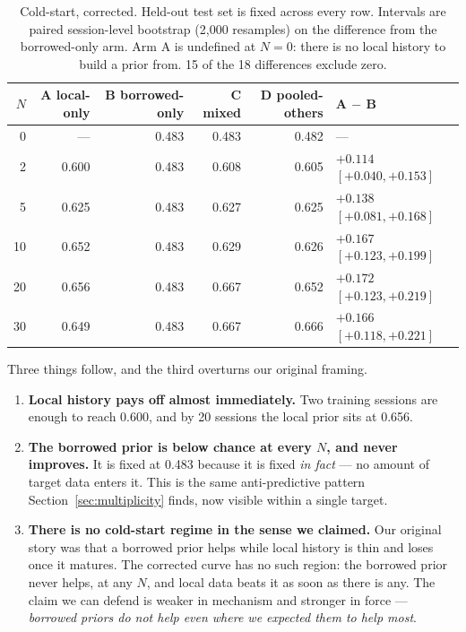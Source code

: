 \documentclass[11pt]{article}
\begin{document}
\begin{table}[h]
\centering
\caption{Cold-start, corrected. Held-out test set is fixed across every row.
Intervals are paired session-level bootstrap (2{,}000 resamples) on the
difference from the borrowed-only arm. Arm A is undefined at $N=0$: there is
no local history to build a prior from. 15 of the 18 differences exclude
zero.}
\label{tab:coldstart}
\begin{tabular}{rrrrrl}
\toprule
$N$ & A local-only & B borrowed-only & C mixed & D pooled-others & A $-$ B \\
\midrule
0  & ---   & 0.483 & 0.483 & 0.482 & --- \\
2  & 0.600 & 0.483 & 0.608 & 0.605 & $+0.114$ $[+0.040, +0.153]$ \\
5  & 0.625 & 0.483 & 0.627 & 0.625 & $+0.138$ $[+0.081, +0.168]$ \\
10 & 0.652 & 0.483 & 0.629 & 0.626 & $+0.167$ $[+0.123, +0.199]$ \\
20 & 0.656 & 0.483 & 0.667 & 0.652 & $+0.172$ $[+0.123, +0.219]$ \\
30 & 0.649 & 0.483 & 0.667 & 0.666 & $+0.166$ $[+0.118, +0.221]$ \\
\bottomrule
\end{tabular}
\end{table}

Three things follow, and the third overturns our original framing.

\begin{enumerate}
\item \textbf{Local history pays off almost immediately.} Two training
  sessions are enough to reach 0.600, and by 20 sessions the local prior sits
  at 0.656.
\item \textbf{The borrowed prior is below chance at every $N$, and never
  improves.} It is fixed at 0.483 because it is fixed \emph{in fact} --- no
  amount of target data enters it. This is the same anti-predictive pattern
  Section~\ref{sec:multiplicity} finds, now visible within a single target.
\item \textbf{There is no cold-start regime in the sense we claimed.} Our
  original story was that a borrowed prior helps while local history is thin
  and loses once it matures. The corrected curve has no such region: the
  borrowed prior never helps, at any $N$, and local data beats it as soon as
  there is any. The claim we can defend is weaker in mechanism and stronger
  in force --- \emph{borrowed priors do not help even where we expected them
  to help most}.
\end{enumerate}
\end{document}

